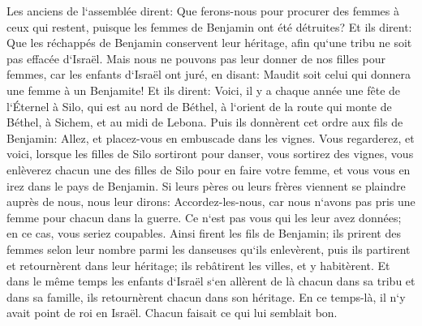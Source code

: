 \verse Les anciens de l`assemblée dirent: Que ferons-nous pour procurer des femmes à ceux qui restent, puisque les femmes de Benjamin ont été détruites? 
\verse Et ils dirent: Que les réchappés de Benjamin conservent leur héritage, afin qu`une tribu ne soit pas effacée d`Israël. 
\verse Mais nous ne pouvons pas leur donner de nos filles pour femmes, car les enfants d`Israël ont juré, en disant: Maudit soit celui qui donnera une femme à un Benjamite! 
\verse Et ils dirent: Voici, il y a chaque année une fête de l`Éternel à Silo, qui est au nord de Béthel, à l`orient de la route qui monte de Béthel, à Sichem, et au midi de Lebona. 
\verse Puis ils donnèrent cet ordre aux fils de Benjamin: Allez, et placez-vous en embuscade dans les vignes. 
\verse Vous regarderez, et voici, lorsque les filles de Silo sortiront pour danser, vous sortirez des vignes, vous enlèverez chacun une des filles de Silo pour en faire votre femme, et vous vous en irez dans le pays de Benjamin. 
\verse Si leurs pères ou leurs frères viennent se plaindre auprès de nous, nous leur dirons: Accordez-les-nous, car nous n`avons pas pris une femme pour chacun dans la guerre. Ce n`est pas vous qui les leur avez données; en ce cas, vous seriez coupables. 
\verse Ainsi firent les fils de Benjamin; ils prirent des femmes selon leur nombre parmi les danseuses qu`ils enlevèrent, puis ils partirent et retournèrent dans leur héritage; ils rebâtirent les villes, et y habitèrent. 
\verse Et dans le même temps les enfants d`Israël s`en allèrent de là chacun dans sa tribu et dans sa famille, ils retournèrent chacun dans son héritage. 
\verse En ce temps-là, il n`y avait point de roi en Israël. Chacun faisait ce qui lui semblait bon. 
